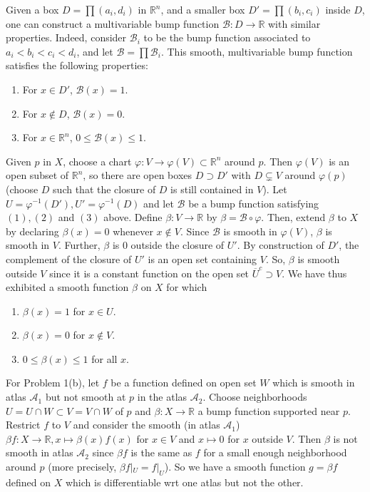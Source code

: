\documentclass{amsart}
\numberwithin{equation}{section}
\theoremstyle{plain}
\theoremstyle{definition}
\theoremstyle{remark}
\newcommand{\A}{\mathcal{A}}
\newcommand{\B}{\mathcal{B}}
\renewcommand{\_}[2]{\underbrace{#1}_{#2}}
\renewcommand{\^}[2]{\overbrace{#1}_{#2}}
\newcommand{\R}{\mathbb{R}}
\begin{document}
Given a box $D = \prod (a_i, d_i)$ in $\R^n$, and a smaller box $D' = \prod (b_i,c_i)$ inside $D$, one can construct a multivariable bump function $\B: D \to \R$ with similar properties. Indeed, consider $\B_i$ to be the bump function associated to $a_i < b_i < c_i < d_i$, and let $\B = \prod \B_i$. This smooth, multivariable bump function satisfies the following properties:

\begin{enumerate}
\item For $x \in D'$, $\B(x) = 1$.
\item For $x \not \in D$, $\B(x) = 0$.
\item For $x \in \R^n$, $0 \leq \B(x) \leq 1$.
\end{enumerate}

Given $p$ in $X$, choose a chart $\varphi: V \to \varphi(V) \subset \R^n$ around $p$. Then $\varphi(V)$ is an open subset of $\R^n$, so there are open boxes $D \supset D'$ with $D \subsetneq V$ around $\varphi(p)$ (choose $D$ such that the closure of $D$ is still contained in $V$). Let $U = \varphi^{-1}(D'), U' = \varphi^{-1}(D)$ and let $\B$ be a bump function satisfying $(1),(2)$ and $(3)$ above. Define $\beta: V \to \R$ by $\beta = \B \circ \varphi$. Then, extend $\beta$ to $X$ by declaring $\beta(x) = 0$ whenever $x\not \in V$. Since $\B$ is smooth in $\varphi(V)$, $\beta$ is smooth in $V$. Further, $\beta$ is $0$ outside the closure of $U'$. By construction of $D'$, the complement of the closure of $U'$ is an open set containing $V$. So, $\beta$ is smooth outside $V$ since it is a constant function on the open set $\overline U^c \supset V$. We have thus exhibited a smooth function $\beta$ on $X$ for which

\begin{enumerate}
\item $\beta(x) = 1$ for $x \in U$.
\item $\beta(x) = 0$ for $x \not \in V$.
\item $0\leq \beta(x) \leq 1$ for all $x$.
\end{enumerate}

For Problem 1(b), let $f$ be a function defined on open set $W$ which is smooth in atlas $\A_1$ but not smooth at $p$ in the atlas $\A_2$. Choose neighborhoods $U = U \cap W \subset V = V\cap W$ of $p$ and $\beta: X \to \R$ a bump function supported near $p$. Restrict $f$ to $V$ and consider the smooth (in atlas $\A_1$) $\beta f: X \to \R, x \mapsto \beta(x) f(x)$ for $x \in V$ and $x \mapsto 0$ for $x$ outside $V$. Then $\beta$ is not smooth in atlas $\A_2$ since $\beta f$ is the same as $f$ for a small enough neighborhood around $p$ (more precisely, $\beta f|_U = f|_U$). So we have a smooth function $g = \beta f$ defined on $X$ which is differentiable wrt one atlas but not the other. 
\end{document}
